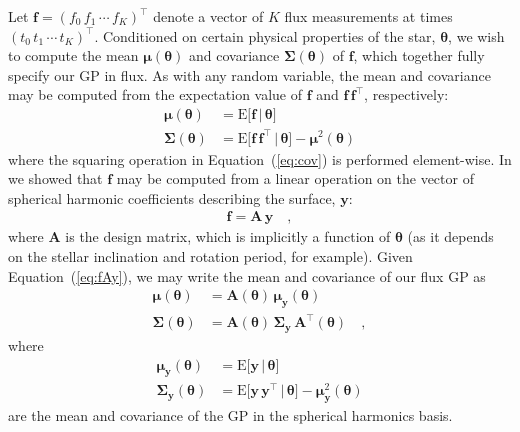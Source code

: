 \documentclass[modern]{aastex62}
\begin{document}
Let
$\mathbf{f} = \left( f_0 \, f_1 \, \cdots \,  f_K \right)^\top$
denote a vector of $K$ flux measurements at times
$\left( t_0 \,  t_1 \,  \cdots \, t_K \right)^\top$.
Conditioned on certain physical properties of the star, $\pmb{\theta}$,
we wish to compute the mean $\pmb{\mu}(\pmb{\theta})$ and
covariance $\pmb{\Sigma}(\pmb{\theta})$
of $\mathbf{f}$, which together fully specify our GP in flux.
%
As with any random variable, the mean and covariance may be computed from
the expectation value of $\mathbf{f}$ and
$\mathbf{f}\,\mathbf{f}^\top$, respectively:
%
\begin{align}
    \label{eq:mean}
    \pmb{\mu}(\pmb{\theta})
     & = \mathrm{E} \Big[ \mathbf{f} \, \Big| \, \pmb{\theta} \Big]
    \\
    \label{eq:cov}
    \pmb{\Sigma}(\pmb{\theta})
     & = \mathrm{E} \Big[ \mathbf{f} \, \mathbf{f}^\top \, \Big| \, \pmb{\theta} \Big] - \pmb{\mu}^2(\pmb{\theta})
\end{align}
%
where the squaring operation in Equation~(\ref{eq:cov}) is
performed element-wise.
%
In \citet{Luger2019} we showed that $\mathbf{f}$ may be computed from a
linear operation on the vector of spherical harmonic coefficients
describing the surface, $\mathbf{y}$:
%
\begin{align}
    \label{eq:fAy}
    \mathbf{f} = \mathbf{A} \, \mathbf{y}
    \quad,
\end{align}
%
where $\mathbf{A}$ is the \starry design matrix, which is implicitly
a function of $\pmb{\theta}$ (as it depends on the stellar inclination
and rotation period, for example).
%
Given Equation~(\ref{eq:fAy}),
we may write the mean and covariance of our flux GP as
%
\begin{align}
    \pmb{\mu}(\pmb{\theta})
     & = \mathbf{A}(\pmb{\theta}) \, \pmb{\mu}_{\mathbf{y}}(\pmb{\theta})
    \\
    \pmb{\Sigma}(\pmb{\theta})
     & = \mathbf{A}(\pmb{\theta}) \, \pmb{\Sigma}_{\mathbf{y}} \, \mathbf{A}^\top(\pmb{\theta})
    \quad,
\end{align}
%
where
%
\begin{align}
    \label{eq:mean_y}
    \pmb{\mu}_{\mathbf{y}}(\pmb{\theta})
     & = \mathrm{E} \Big[ \mathbf{y} \, \Big| \, \pmb{\theta} \Big]
    \\
    \label{eq:cov_y}
    \pmb{\Sigma}_{\mathbf{y}}(\pmb{\theta})
     & = \mathrm{E} \Big[ \mathbf{y} \, \mathbf{y}^\top \, \Big| \, \pmb{\theta} \Big] - \pmb{\mu}_{\mathbf{y}}^2(\pmb{\theta})
\end{align}
%
are the mean and covariance of the GP in the spherical harmonics basis.
\end{document}
